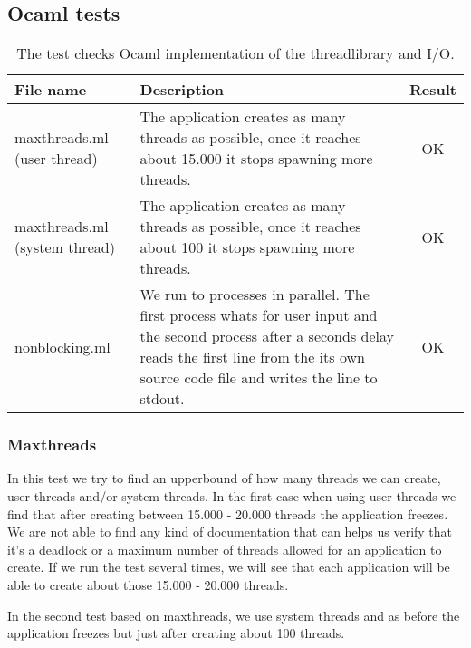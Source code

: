\documentclass[a4paper,12pt]{article}
\begin{document}
\subsection{Ocaml tests}
\label{ocamltests}
\begin{table}[!h]
  \begin{center}
    \begin{tabular}{|p{3cm}|p{8.5cm}|c|}
      \hline
      File name &
      Description &
      Result \\
      \hline
      maxthreads.ml (user thread) &
      The application creates as many threads as possible, once it reaches
      about 15.000 it stops spawning more threads.&
      OK \\
      \hline
      maxthreads.ml (system thread) &
      The application creates as many threads as possible, once it reaches
      about 100 it stops spawning more threads.&
      OK \\
      \hline
      nonblocking.ml &
      We run to processes in parallel. The first process whats for user input
      and the second process after a seconds delay reads the first line from
      the its own source code file and writes the line to stdout.&
      OK \\
      \hline
    \end{tabular} 
    \caption{The test checks Ocaml implementation of the threadlibrary and I/O.}
    \label{testtable}
  \end{center}
\end{table}

\subsubsection{Maxthreads}
In this test we try to find an upperbound of how many threads we can create,
user threads and/or system threads. In the first case when using user threads we
find that after creating between 15.000 - 20.000 threads the application
freezes. We are not able to find any kind of documentation that can helps us
verify that it's a deadlock or a maximum number of threads allowed for an
application to create. If we run the test several times, we will see that
each application will be able to create about those 15.000 - 20.000 threads.

In the second test based on maxthreads, we use system threads and as before
the application freezes but just after creating about 100 threads.
\end{document}
